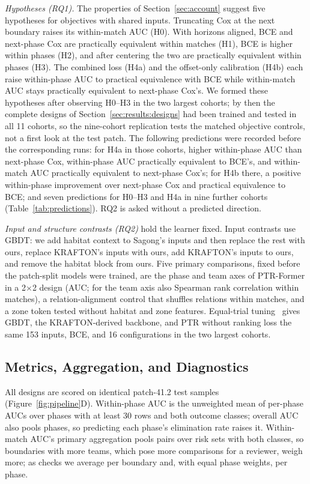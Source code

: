 \documentclass[sigconf,anonymous]{acmart}
\begin{document}
\emph{Hypotheses (RQ1).} The properties of Section~\ref{sec:account} suggest five hypotheses for objectives with shared inputs. Truncating Cox at the next boundary raises its within-match AUC (H0). With horizons aligned, BCE and next-phase Cox are practically equivalent within matches (H1), BCE is higher within phases (H2), and after centering the two are practically equivalent within phases (H3). The combined loss (H4a) and the offset-only calibration (H4b) each raise within-phase AUC to practical equivalence with BCE while within-match AUC stays practically equivalent to next-phase Cox's. We formed these hypotheses after observing H0--H3 in the two largest cohorts; by then the complete designs of Section~\ref{sec:results:designs} had been trained and tested in all 11 cohorts, so the nine-cohort replication tests the matched objective controls, not a first look at the test patch. The following predictions were recorded before the corresponding runs: for H4a in those cohorts, higher within-phase AUC than next-phase Cox, within-phase AUC practically equivalent to BCE's, and within-match AUC practically equivalent to next-phase Cox's; for H4b there, a positive within-phase improvement over next-phase Cox and practical equivalence to BCE; and seven predictions for H0--H3 and H4a in nine further cohorts (Table~\ref{tab:predictions}). RQ2 is asked without a predicted direction.

\emph{Input and structure contrasts (RQ2)} hold the learner fixed. Input contrasts use GBDT: we add habitat context to Sagong's inputs and then replace the rest with ours, replace KRAFTON's inputs with ours, add KRAFTON's inputs to ours, and remove the habitat block from ours. Five primary comparisons, fixed before the patch-split models were trained, are the phase and team axes of PTR-Former in a 2$\times$2 design (AUC; for the team axis also Spearman rank correlation within matches), a relation-alignment control that shuffles relations within matches, and a zone token tested without habitat and zone features. Equal-trial tuning~\cite{Bergstra12,Cawley10} gives GBDT, the KRAFTON-derived backbone, and PTR without ranking loss the same 153 inputs, BCE, and 16 configurations in the two largest cohorts.

\subsection{Metrics, Aggregation, and Diagnostics}
\label{sec:method:units}
All designs are scored on identical patch-41.2 test samples (Figure~\ref{fig:pipeline}D). Within-phase AUC is the unweighted mean of per-phase AUCs over phases with at least 30 rows and both outcome classes; overall AUC also pools phases, so predicting each phase's elimination rate raises it. Within-match AUC's primary aggregation pools pairs over risk sets with both classes, so boundaries with more teams, which pose more comparisons for a reviewer, weigh more; as checks we average per boundary and, with equal phase weights, per phase.
\end{document}
